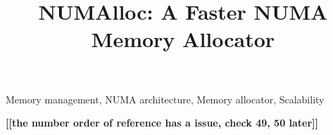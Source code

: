 \documentclass[conference]{IEEEtran}
\newcommand{\todo}[1]{{\color{red}\bfseries [[#1]]}}
\begin{document}
\title{NUMAlloc: A Faster NUMA Memory Allocator} 


\maketitle

\begin{abstract}

\end{abstract}

\begin{IEEEkeywords}
Memory management, NUMA architecture, Memory allocator, Scalability
\end{IEEEkeywords}

\thispagestyle{plain}
\pagestyle{plain}









\todo{the number order of reference has a issue, check 49, 50 later}



\end{document}
